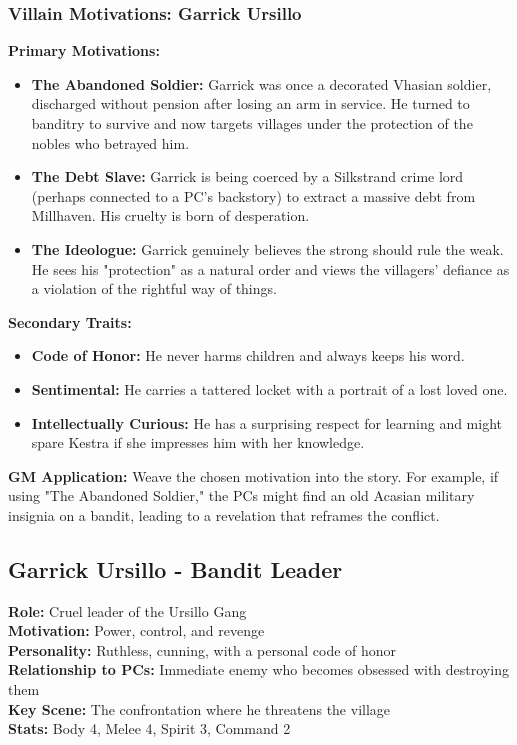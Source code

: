 \documentclass[11pt]{article}
\newenvironment{characterbox}[1]{%
  \begin{mdframed}[backgroundcolor=shadecolor, linewidth=1pt, linecolor=headercolor]%
  \subsection*{#1}%
}{%
  \end{mdframed}%
}
\newenvironment{mechanic}[1]{%
  \begin{mdframed}[backgroundcolor=tableheader, linewidth=1pt, linecolor=accentcolor]%
  \subsubsection*{#1}%
}{%
  \end{mdframed}%
}
\begin{document}
\begin{mechanic}{Villain Motivations: Garrick Ursillo}

\textbf{Primary Motivations:}
\begin{itemize}
\item \textbf{The Abandoned Soldier:} Garrick was once a decorated Vhasian soldier, discharged without pension after losing an arm in service. He turned to banditry to survive and now targets villages under the protection of the nobles who betrayed him.
\item \textbf{The Debt Slave:} Garrick is being coerced by a Silkstrand crime lord (perhaps connected to a PC's backstory) to extract a massive debt from Millhaven. His cruelty is born of desperation.
\item \textbf{The Ideologue:} Garrick genuinely believes the strong should rule the weak. He sees his "protection" as a natural order and views the villagers' defiance as a violation of the rightful way of things.
\end{itemize}

\textbf{Secondary Traits:}
\begin{itemize}
\item \textbf{Code of Honor:} He never harms children and always keeps his word.
\item \textbf{Sentimental:} He carries a tattered locket with a portrait of a lost loved one.
\item \textbf{Intellectually Curious:} He has a surprising respect for learning and might spare Kestra if she impresses him with her knowledge.
\end{itemize}

\textbf{GM Application:} Weave the chosen motivation into the story. For example, if using "The Abandoned Soldier," the PCs might find an old Acasian military insignia on a bandit, leading to a revelation that reframes the conflict.

\end{mechanic}

\begin{characterbox}{Garrick Ursillo - Bandit Leader}
\textbf{Role:} Cruel leader of the Ursillo Gang \\
\textbf{Motivation:} Power, control, and revenge \\
\textbf{Personality:} Ruthless, cunning, with a personal code of honor \\
\textbf{Relationship to PCs:} Immediate enemy who becomes obsessed with destroying them \\
\textbf{Key Scene:} The confrontation where he threatens the village \\
\textbf{Stats:} Body 4, Melee 4, Spirit 3, Command 2
\end{characterbox}
\end{document}
